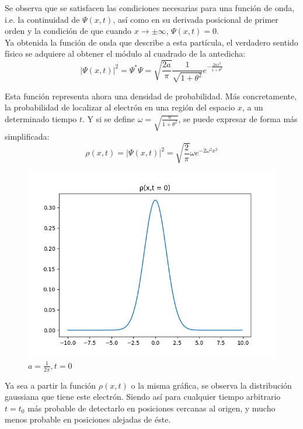 Se observa que se satisfacen las condiciones necesarias para una función de onda, i.e. la continuidad de $\Psi(x,t)$, 
así como en su derivada posicional de primer orden y la condición de que cuando $x\rightarrow\pm\infty$, $\Psi(x,t)=0$.\\

Ya obtenida la función de onda que describe a esta partícula, el verdadero sentido físico se adquiere al obtener el 
módulo al cuadrado de la antedicha:
\begin{equation*}
    \lvert\Psi(x,t)\rvert^2 = \Psi^*\Psi = \sqrt{\frac{2a}{\pi}} \frac{1}{\sqrt{1+\theta^2}} e^{-\frac{2ax^2}{1+\theta^2}}
\end{equation*}

Esta función representa ahora una densidad de probabilidad. Más concretamente, la probabilidad de localizar al electrón 
en una región del espacio $x$, a un determinado tiempo $t$. Y si se define $\omega=\sqrt{\frac{a}{1+\theta^2}}$, se puede 
expresar de forma más simplificada:
\begin{equation}
    \rho(x,t) = \lvert\Psi(x,t)\rvert^2 = \sqrt{\frac{2}{\pi}} \omega e^{-2\omega^2x^2}
\end{equation}

\begin{figure}[H]
    \includegraphics[scale=0.45]{imagenes/graficas_particulalibre/rho(x,t).png}
    \caption{\emph{$a = \frac{1}{2\pi}, t = 0$}}
\end{figure}

Ya sea a partir la función $\rho(x,t)$ o la misma gráfica, se observa la distribución gaussiana que tiene este electrón. 
Siendo así para cualquier tiempo arbitrario $t=t_{0}$ más probable de detectarlo en posiciones cercanas al origen, y mucho 
menos probable en posiciones alejadas de éste.\\

